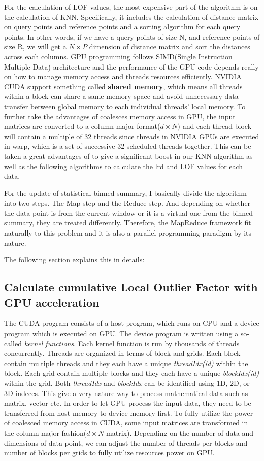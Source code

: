 \documentclass[11pt]{article}       %
\begin{document}
For the calculation of LOF values, the most expensive part of the algorithm is on the calculation of KNN. Specifically, it includes the calculation of distance matrix on query points and reference points and a sorting algorithm for each query points. In other words, if we have a query points of size N, and reference points of size R, we will get a $N \times P$ dimension of distance matrix and sort the distances across each columns. GPU programming follows SIMD(Single Instruction Multiple Data) architecture and the performance of the GPU code depends really on how to manage memory access and threads resources efficiently. NVIDIA CUDA support something called \textbf{shared memory}, which means all threads within a block can share a same memory space and avoid unnecessary data transfer between global memory to each individual threads' local memory. To further take the advantages of coalesces memory access in GPU, the input matrices are converted to a column-major format($d \times N$) and each thread block will contain a multiple of 32 threads since threads in NVIDIA GPUs are executed in warp, which is a set of successive 32 scheduled threads together. This can be taken a great advantages of to give a significant boost in our KNN algorithm as well as the following algorithms to calculate the lrd and LOF values for each data. 

For the update of statistical binned summary, I basically divide the algorithm into two steps. The Map step and the Reduce step. And depending on whether the data point is from the current window or it is a virtual one from the binned summary, they are treated differently. Therefore, the MapReduce framework fit naturally to this problem and it is also a parallel programming paradigm by its nature.

The following section explains this in details:

\subsection{Calculate cumulative Local Outlier Factor with GPU acceleration}

The CUDA program consists of a host program, which runs on CPU and a device program which is executed on GPU. The device program is written using a so-called \textit{kernel functions}. Each kernel function is run by thousands of threads concurrently. Threads are organized in terms of block and grids. Each block contain multiple threads and they each have a unique \textit{threadIdx(id)} within the block. Each grid contain multiple blocks and they each have a unique \textit{blockIdx(id)} within the grid. Both \textit{threadIdx} and \textit{blockIdx} can be identified using 1D, 2D, or 3D indeces. This give a very nature way to process mathematical data such as matrix, vector etc. In order to let GPU process the input data, they need to be transferred from host memory to device memory first. To fully utilize the power of coalesced memory access in CUDA, some input matrices are transformed in the column-major fashion($d \times N$ matrix). Depending on the number of data and dimensions of data point, we can adjust the number of threads per blocks and number of blocks per grids to fully utilize resources power on GPU. 
\end{document}
